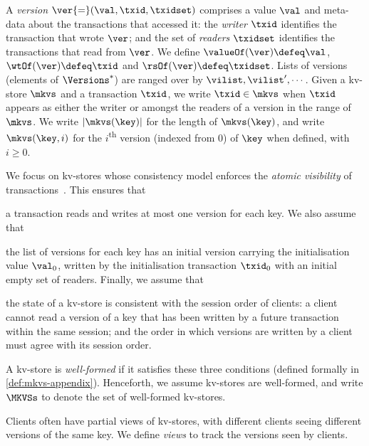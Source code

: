 A \emph{version} $\ver {=} (\val, \txid, \txidset)$ comprises  a value $\val$
and meta-data about the transactions that accessed it: the \emph{writer} $\txid$ identifies the transaction that wrote $\ver$;
and the set of \emph{readers} $\txidset$ identifies  the  transactions
that read from  $\ver$.
We define $\valueOf(\ver) \defeq \val$,
$\wtOf(\ver) \defeq \txid$ and $\rsOf(\ver) \defeq \txidset$. 
Lists of versions (elements of $\Versions^{\ast}$) are ranged over by $\vilist, \vilist',\cdots$.
Given a kv-store $\mkvs$ and a transaction $\txid$, we write 
$\txid \in \mkvs$ when $\txid$ appears as either the writer or amongst the readers of a version in the range of $\mkvs$.
We write  $\lvert \mkvs(\key) \rvert$ for the length of $\mkvs(\key)$, 
and write $\mkvs(\key, i)$ for the $i$\textsuperscript{th} version (indexed from 0) of $\key$ when defined, with $i \geq 0$.


We focus on kv-stores whose consistency model enforces the \emph{atomic visibility} of transactions~\cite{framework-concur}. 
This ensures that 
\begin{enumerate*}
	\item a transaction reads and writes at most one version for each key.
We also assume that 
	\item the list of versions for each key has an initial version 
carrying the initialisation value $\val_0$,  written by the 
initialisation transaction $\txid_0$ 
with an initial empty set of readers.
Finally, we assume that 
	\item the state of a kv-store is consistent with 
the session order of clients: a client cannot read a version of a key that has 
been written by a future transaction within the same session;  and 
the order in which versions are written by a client must agree 
with its session order. 
\end{enumerate*}
A kv-store is \emph{well-formed} if it satisfies these three conditions (defined formally in \cref{def:mkvs-appendix}). 
Henceforth, we assume kv-stores are well-formed, and write  $\MKVSs$ to denote 
the set of well-formed kv-stores.

Clients often have partial views of kv-stores, 
with different clients seeing 
different versions of the same key.
We define \emph{views} to track the versions seen by clients. 

